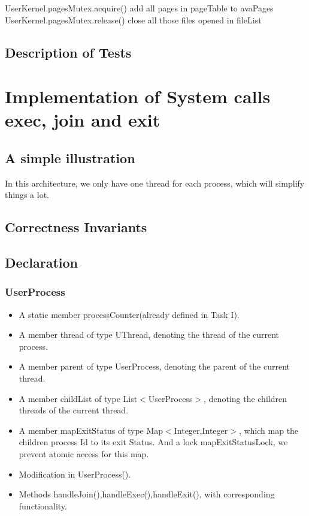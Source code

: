 \documentclass{article}
\begin{document}
    \begin{algorithm}[H]
		\begin{algorithmic}
			\State UserKernel.pagesMutex.acquire()
			\State add all pages in pageTable to avaPages
			\State UserKernel.pagesMutex.release()
			\State close all those files opened in fileList
			\EndProcedure
		\end{algorithmic}
	\end{algorithm}
	\subsection{Description of Tests}
	\section{Implementation of System calls exec, join and exit}
	\subsection{A simple illustration}
	In this architecture, we only have one thread for each process, which will simplify things a lot.
	\subsection{Correctness Invariants}
	\subsection{Declaration}
	\subsubsection*{UserProcess}
	\begin{itemize}
		\item A static member processCounter(already defined in Task I).
		\item A member thread of type UThread, denoting the thread of the current process.
		\item A member parent of type UserProcess, denoting the parent of the current thread.
		\item A member childList of type List$<$UserProcess$>$, denoting the children threads of the current thread.
		\item A member mapExitStatus of type Map$<$Integer,Integer$>$, which map the children process Id to its exit Status. And a lock mapExitStatusLock, we prevent atomic access for this map.
		
		\item Modification in UserProcess().
		
		\item Methods handleJoin(),handleExec(),handleExit(), with corresponding functionality.
	\end{itemize}
\end{document}
